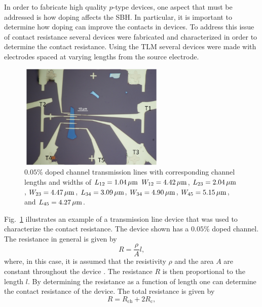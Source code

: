 \noindent In order to fabricate high quality $p$-type  devices, one aspect that must be addressed is how doping affects the \ac{SBH}. In particular, it is important to determine how doping can improve the contacts in devices. To address this issue of contact resistance several devices were fabricated and characterized in order to determine the contact resistance. Using the \ac{TLM} several  devices were made with electrodes spaced at varying lengths from the source electrode. 
\begin{figure}[ht]
	\centering
	\includegraphics[height=5cm,width=7cm]{figs/results/transmission_line/transmission_device_pic_5-5_21_10232015_no1}
	\caption[Transmission line $0.05\%$  doped  channel device]{$0.05\%$  doped  channel transmission lines with corresponding channel lengths and widths of $L_{12} = 1.04\,\mathrm{\mu m}$ $W_{12} = 4.42\,\mathrm{\mu m}$, $L_{23} = 2.04\,\mathrm{\mu m}$, $W_{23} = 4.47\,\mathrm{\mu m}$, $L_{34} = 3.09\,\mathrm{\mu m}$, $W_{34} = 4.90\,\mathrm{\mu m}$, $W_{45} = 5.15\,\mathrm{\mu m}$, and $L_{45} = 4.27\,\mathrm{\mu m}$.}
	\label{fig:transmission_device_10232015_no1}
\end{figure}
Fig.~\ref{fig:transmission_device_10232015_no1} illustrates an example of a transmission line device that was used to characterize the contact resistance. The device shown has a $0.05\%$  doped  channel. The resistance in general is given by
\begin{equation}\label{eq:resistance_formula}
	R = \frac{\rho}{A} l,
\end{equation}
where, in this case, it is assumed that the resistivity $\rho$ and the area $A$ are constant throughout the device \cite{Schroder_Semiconductor2006}. The resistance $R$ is then proportional to the length $l$. By determining the resistance as a function of length one can determine the contact resistance of the device. The total resistance is given by
\begin{equation}\label{eq:resistance_total}
	R = R_\mathrm{ch} + 2R_\mathrm{c},
\end{equation}
